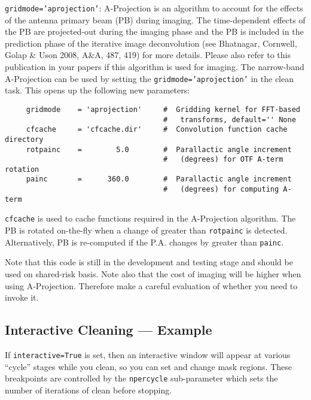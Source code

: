 {\tt gridmode='aprojection'}: A-Projection is an algorithm to account
for the effects of the antenna primary beam (PB) during imaging.  The
time-dependent effects of the PB are projected-out during the imaging
phase and the PB is included in the prediction phase of the iterative
image deconvolution (see Bhatnagar, Cornwell, Golap \& Uson 2008,
A\&A, 487, 419) for more details.  Please also refer to this
publication in your papers if this algorithm is used for imaging. The
narrow-band A-Projection can be used by setting the
{\tt gridmode='aprojection'} in the clean task.  This opens up the following
new parameters:

\small
\begin{verbatim}
     gridmode    = 'aprojection'     #  Gridding kernel for FFT-based
                                     #   transforms, default='' None
     cfcache     = 'cfcache.dir'     #  Convolution function cache directory
     rotpainc    =        5.0        #  Parallactic angle increment
                                     #   (degrees) for OTF A-term rotation
     painc       =      360.0        #  Parallactic angle increment
                                     #   (degrees) for computing A-term
\end{verbatim}
\normalsize

{\tt cfcache} is used to cache functions required in the A-Projection
algorithm.  The PB is rotated on-the-fly when a change of greater than
{\tt rotpainc} is detected.  Alternatively, PB is re-computed if the P.A.
changes by greater than {\tt painc}.

Note that this code is still in the development and testing stage and
should be used on shared-risk basis.  Note also that the cost of
imaging will be higher when using A-Projection.  Therefore make a
careful evaluation of whether you need to invoke it.


\subsection{Interactive Cleaning --- Example}
\label{section:im.clean.exampleinteractive}

If {\tt interactive=True} is set, then an interactive window
will appear at various ``cycle'' stages while you clean, so you
can set and change mask regions.  These breakpoints are controlled
by the {\tt npercycle} sub-parameter which sets the number of
iterations of clean before stopping.

